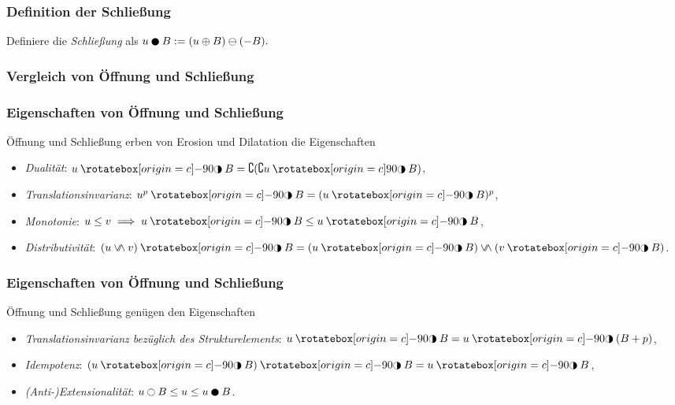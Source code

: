 \documentclass{beamer}
\begin{document}
\begin{frame}
    \frametitle{Definition der Schließung}
    \begin{definition}
        Definiere die \emph{Schließung} als
        \begin{math}
            u \close B := (u \dilate B) \erode (-B).
        \end{math}
    \end{definition}
\end{frame}

\begin{frame}
    \frametitle{Vergleich von Öffnung und Schließung}
\end{frame}

\begin{frame}
    \frametitle{Eigenschaften von Öffnung und Schließung}
    \begin{lemma}
        Öffnung und Schließung erben von Erosion und Dilatation die Eigenschaften
        \begin{itemize}
            \item
                \emph{Dualität}: $u \openclose B = \complement (\complement u \closeopen B)$,
            \item
                \emph{Translationsinvarianz}: $u^p \openclose B = (u \openclose B)^p$,
            \item
                \emph{Monotonie}: $u \le v \implies u \openclose B \le u \openclose B$,
            \item
                \emph{Distributivität}: $(u \veewedge v) \openclose B = (u \openclose B) \veewedge (v \openclose B)$.
        \end{itemize}
    \end{lemma}
\end{frame}

\begin{frame}
    \frametitle{Eigenschaften von Öffnung und Schließung}
    \begin{lemma}
        Öffnung und Schließung genügen den Eigenschaften
        \begin{itemize}
            \item
                \emph{Translationsinvarianz bezüglich des Strukturelements}: $u \openclose B = u \openclose (B + p)$,
            \item
                \emph{Idempotenz}: $(u \openclose B) \openclose B = u \openclose B$,
            \item
                \emph{(Anti-)Extensionalität}: $u \open B \le u \le u \close B$.
        \end{itemize}
    \end{lemma}
\end{frame}
\end{document}
